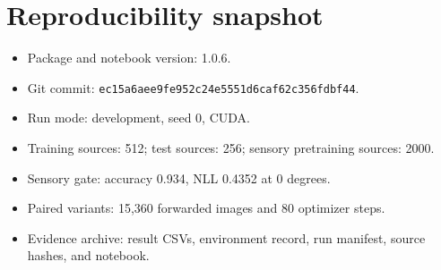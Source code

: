 \documentclass[11pt,a4paper]{article}
\begin{document}
\section{Reproducibility snapshot}

\begin{itemize}
\item Package and notebook version: 1.0.6.
\item Git commit: \texttt{ec15a6aee9fe952c24e5551d6caf62c356fdbf44}.
\item Run mode: development, seed 0, CUDA.
\item Training sources: 512; test sources: 256; sensory pretraining sources: 2000.
\item Sensory gate: accuracy 0.934, NLL 0.4352 at $0$ degrees.
\item Paired variants: 15,360 forwarded images and 80 optimizer steps.
\item Evidence archive: result CSVs, environment record, run manifest, source hashes, and notebook.
\end{itemize}



\end{document}
